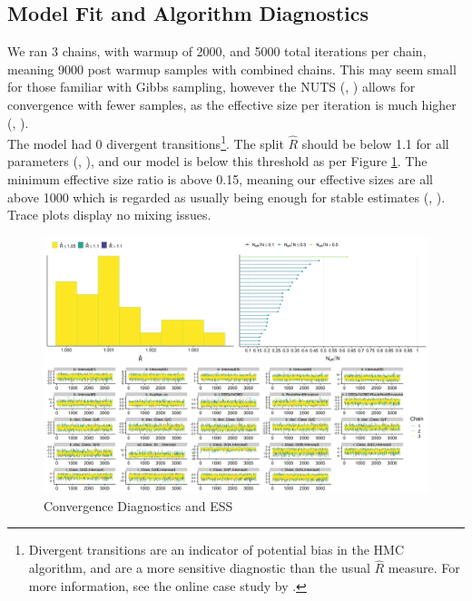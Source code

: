 \documentclass[11pt,twoside]{article}
\numberwithin{Theorem}{section}
\numberwithin{Definition}{section}
\numberwithin{Lemma}{section}
\numberwithin{Algorithm}{section}
\numberwithin{equation}{section}
\begin{document}
\newpage

\subsection{Model Fit and Algorithm Diagnostics}

We ran 3 chains, with warmup of 2000, and 5000 total iterations per chain, meaning 9000 post warmup samples with combined chains. This may seem small for those familiar with Gibbs sampling, however the NUTS (\citeauthor{Hoffman2014}, \citeyear{Hoffman2014}) allows for convergence with fewer samples, as the effective size per iteration is much higher (\citeauthor{Burknerbrms1}, \citeyear{Burknerbrms1}). \\

The model had 0 divergent transitions\footnote{Divergent transitions are an indicator of potential bias in the HMC algorithm, and are a more sensitive diagnostic than the usual $\hat{R}$ measure. For more information, see the online case study by \cite{BetancourtDivergence2017}.}. The split $\hat{R}$ should be below 1.1 for all parameters (\citeauthor{GelmanBDA2013}, \citeyear{GelmanBDA2013}), and our model is below this threshold as per Figure \ref{fig::3_Convergence}. The minimum effective size ratio is above 0.15, meaning our effective sizes are all above 1000 which is regarded as usually being enough for stable estimates (\citeauthor{BurknerVuorre2018}, \citeyear{BurknerVuorre2018}). Trace plots display no mixing issues. 

\begin{figure}[h!]
	\centering
	\includegraphics[width = \textwidth, height = 0.5\textheight]{Figures/3_1_Primary_Convergence.png}
	\caption{Convergence Diagnostics and ESS} \label{fig::3_Convergence}	
\end{figure}
\end{document}
